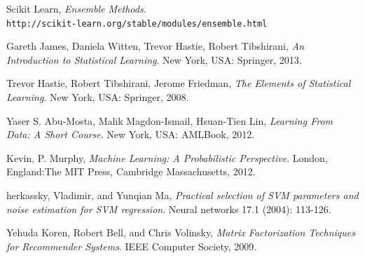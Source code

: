 \documentclass{article}
\begin{document}
\begin{spacing}{1}
\begin{large}
\begin{thebibliography}{9}
	Scikit Learn,
	\textit{Ensemble Methods}.
	\\\texttt{http://scikit-learn.org/stable/modules/ensemble.html}

	Gareth James, Daniela Witten, Trevor Hastie, Robert Tibshirani, \textit{An Introduction to Statistical Learning}. New York, USA: Springer, 2013.

	Trevor Hastie, Robert Tibshirani, Jerome Friedman, \textit{The Elements of Statistical Learning}. New York, USA: Springer, 2008.

	Yaser S. Abu-Mosta, Malik Magdon-Ismail, Hsuan-Tien Lin, \textit{Learning From Data: A Short Course}. New York, USA: AMLBook, 2012.

	Kevin, P. Murphy, \textit{Machine Learning: A Probabilistic Perspective}. London, England:The MIT Press, Cambridge Massachusetts, 2012.

	herkassky, Vladimir, and Yunqian Ma, \textit{Practical selection of SVM parameters and noise estimation for SVM regression}. Neural networks 17.1 (2004): 113-126.

	Yehuda Koren, Robert Bell, and  Chris Volinsky,
	\textit{Matrix Factorization Techniques for Recommender Systems}. IEEE Computer Society, 2009.
\end{thebibliography}

\end{large}
\end{spacing}
\end{document}

